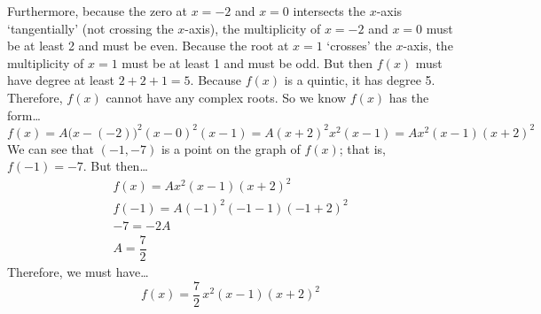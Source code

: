 \documentclass[11pt,letterpaper]{article}
\begin{document}
Furthermore, because the zero at $x= -2$ and $x= 0$ intersects the $x$-axis `tangentially' (not crossing the $x$-axis), the multiplicity of $x= -2$ and $x= 0$ must be at least 2 and must be even. Because the root at $x= 1$ `crosses' the $x$-axis, the multiplicity of $x= 1$ must be at least 1 and must be odd. But then $f(x)$ must have degree at least $2 + 2 + 1= 5$. Because $f(x)$ is a quintic, it has degree 5. Therefore, $f(x)$ cannot have any complex roots. So we know $f(x)$ has the form\dots
	\[
	f(x)= A \big(x - (-2) \big)^2 (x - 0)^2 (x - 1)= A(x + 2)^2 x^2 (x - 1)= A x^2 (x - 1) (x + 2)^2
	\]
We can see that $(-1, -7)$ is a point on the graph of $f(x)$; that is, $f(-1)= -7$. But then\dots
	\[
	\begin{gathered}
	f(x)= A x^2 (x - 1) (x + 2)^2 \\[0.3cm]
	f(-1)= A (-1)^2 (-1 - 1) (-1 + 2)^2 \\[0.3cm]
	-7= -2A \\[0.3cm]
	A= \dfrac{7}{2}
	\end{gathered}
	\]
Therefore, we must have\dots
	\[
	f(x)= \frac{7}{2}\, x^2 (x - 1) (x + 2)^2
	\]
\end{document}
